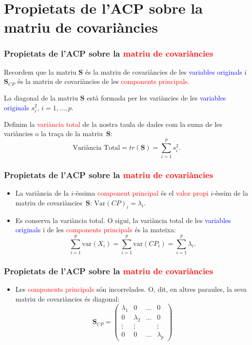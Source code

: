 \documentclass[12pt,t]{beamer}
\newcommand{\red}[1]{\textcolor{red}{#1}}
\newcommand{\blue}[1]{\textcolor{blue}{#1}}
\theoremstyle{plain}
\theoremstyle{definition}
\begin{document}
\section{Propietats de l'ACP sobre la matriu de covariàncies}
\begin{frame}
\frametitle{Propietats de l'ACP sobre la \red{matriu de covariàncies}}
Recordem que la matriu $\mathbf{S}$ és la matriu de covariàncies de les \blue{variables originals} i $\mathbf{S}_{CP}$ 
és la matriu de covariàncies de les \red{components principals.}
\medskip

La diagonal de la matriu $\mathbf{S}$ està formada per les variàncies de les \blue{variables originals} $s_i^2$, 
$i=1,\ldots,p$.
\medskip

Definim la \red{variància total} de la nostra taula de dades com la suma de les variàncies o la traça de la 
matriu~$\mathbf{S}$:
\[
\mbox{Variància Total}=tr(\mathbf{S})=\sum_{i=1}^p s_i^2.
\]
\end{frame}


\begin{frame}
\frametitle{Propietats de l'ACP sobre la \red{matriu de covariàncies}}
\begin{itemize}
\item La variància de la $i$-èssima \red{component principal} és el \red{valor propi} $i$-èssim de la matriu de 
covariàncies~$\mathbf{S}$: $\mbox{Var} (CP)_i =\lambda_i.$
\item Es conserva la variància total. O sigui, la variància total de les \blue{variables originals} i de les 
\red{components principals} és la mateixa:
\[
\sum_{i=1}^p \mbox{var}(X_i) = \sum_{i=1}^p \mbox{var}(CP_i) =\sum_{i=1}^p\lambda_i.
\]

\end{itemize}
\end{frame}

\begin{frame}
\frametitle{Propietats de l'ACP sobre la \red{matriu de covariàncies}}
\begin{itemize}
\item Les \red{components principals} són incorrelades. O, dit, en altres paraules, la seva matriu de covariàncies és 
diagonal:
$$\mathbf{S}_{CP}=\left(\begin{array}{cccc}
\lambda_1& 0 &\ldots &  0\\
0& \lambda_{2}&\ldots & 0\\
\vdots & \vdots & & \vdots\\
0 & 0&\ldots &  \lambda_{p}
\end{array}
\right)$$

\end{itemize}
\end{frame}
\end{document}
